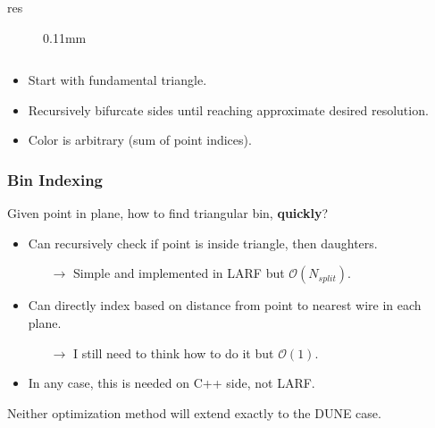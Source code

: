 \documentclass[xcolor=dvipsnames]{beamer}
\begin{document}
\begin{frame}[fragile]
\begin{columns}
\begin{column}{0.4\textwidth}
{\begin{description}
        \item[res] 0.11mm
        \end{description}}
    \end{column}
  \end{columns}
  \begin{itemize}\scriptsize
  \item Start with fundamental triangle.
  \item Recursively bifurcate sides until reaching approximate
    desired resolution.
  \item Color is arbitrary (sum of point indices).
  \end{itemize}

\end{frame}

\begin{frame}
  \frametitle{Bin Indexing}

  Given point in plane, how to find triangular bin, \textbf{quickly}?

  \vfill

  \begin{itemize}
  \item Can recursively check if point is inside triangle, then daughters.
    \begin{itemize}\footnotesize
    \item[$\rightarrow$] Simple and implemented in LARF but $\mathcal{O}(N_{split})$.
    \end{itemize}
  \item Can directly index based on distance from point to nearest
    wire in each plane.
    \begin{itemize}\footnotesize
    \item[$\rightarrow$] I still need to think how to do it but $\mathcal{O}(1)$.
    \end{itemize}
  \item In any case, this is needed on C++ side, not LARF.
  \end{itemize}

  \vfill

  Neither optimization method will extend exactly to the DUNE case.
\end{frame}
\end{document}

